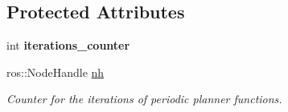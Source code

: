 \subsection*{Protected Attributes}
\begin{DoxyCompactItemize}
\item 
int {\bfseries iterations\+\_\+counter}\hypertarget{classPlanner_a99b577203757a2466e8a3424c28d3449}{}\label{classPlanner_a99b577203757a2466e8a3424c28d3449}

\item 
ros\+::\+Node\+Handle \hyperlink{classPlanner_a9714d036f444a07ce90be8d135b9a40c}{nh}\hypertarget{classPlanner_a9714d036f444a07ce90be8d135b9a40c}{}\label{classPlanner_a9714d036f444a07ce90be8d135b9a40c}

\begin{DoxyCompactList}\small\item\em Counter for the iterations of periodic planner functions. \end{DoxyCompactList}\end{DoxyCompactItemize}
